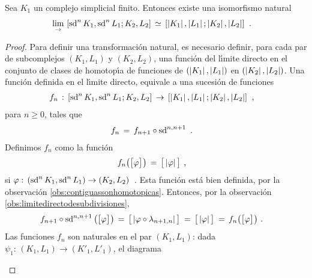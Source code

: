 \begin{teoHomotopicasPorContiguas}\label{thm:homotopicasporcontiguas}
	Sea $K_{1}$ un complejo simplicial finito. Entonces existe una
	isomorfismo natural
	\begin{align*}
		\lim_{\to}\,\contiguas{\subdiv[n]{K_{1}},\subdiv[n]{L_{1}}}%
				{K_{2},L_{2}} & \,\simeq\,
			\homotopicas{\geom{K_{1}},\geom{L_{1}}}%
				{\geom{K_{2}},\geom{L_{2}}}
		\text{ .}
	\end{align*}
\end{teoHomotopicasPorContiguas}

\begin{proof}
	Para definir una transformaci\'{o}n natural, es necesario definir,
	para cada par de subcomplejos $(K_{1},L_{1})$ y $(K_{2},L_{2})$,
	una funci\'{o}n del l\'{\i}mite directo en el conjunto de clases
	de homotop\'{\i}a de funciones de
	$(\geom{K_{1}},\geom{L_{1}})$ en $(\geom{K_{2}},\geom{L_{2}})$. Una
	funci\'{o}n definida en el l\'{\i}mite directo, equivale a una
	sucesi\'{o}n de funciones
	\begin{align*}
		f_{n} & \,:\,\contiguas{\subdiv[n]{K_{1}},\subdiv[n]{L_{1}}}%
				{K_{2},L_{2}}\,\rightarrow\,
			\homotopicas{\geom{K_{1}},\geom{L_{1}}}%
				{\geom{K_{2}},\geom{L_{2}}}
		\text{ ,}
	\end{align*}
	para $n\geq 0$, tales que
	\begin{align*}
		f_{n} & \,=\,f_{n+1}\circ\subdiv[n,n+1]{\null}
		\text{ .}
	\end{align*}
	Definimos $f_{n}$ como la funci\'{o}n
	\begin{align*}
		f_{n}\big(\clase{\varphi}\big) & \,=\,\clase{\geom{\varphi}}
		\text{ ,}
	\end{align*}
	si
	\begin{math}
		\varphi:\,(\subdiv[n]{K_{1}},\subdiv[n]{L_{1}})\rightarrow
			(K_{2},L_{2})
	\end{math}~.
	Esta funci\'{o}n est\'{a} bien definida, por la observaci\'{o}n
	\ref{obs:contiguassonhomotopicas}. Entonces, por la observaci\'{o}n
	\ref{obs:limitedirectodesubdivisiones},
	\begin{align*}
		f_{n+1}\circ\subdiv[n,n+1]{\null}\big(\clase{\varphi}\big)
			& \,=\,\clase{\geom{\varphi\circ\lambda_{n+1,n}}}
			\,=\,\clase{\geom{\varphi}}\,=\,
			f_{n}\big(\clase{\varphi}\big)
		\text{ .}
	\end{align*}
	Las funciones $f_{n}$ son naturales en el par $(K_{1},L_{1})$:
	dada $\psi_{1}:\,(K_{1},L_{1})\rightarrow (K'_{1},L'_{1})$,
	el diagrama
	\begin{center}

\end{center}
\end{proof}
